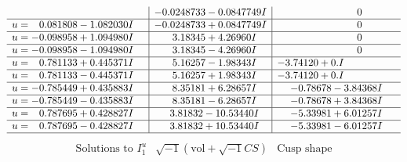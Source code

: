 \documentclass[1p]{elsarticle_modified}
\theoremstyle{definition}
\newcommand{\I}{\sqrt{-1}}
\begin{document}
$$\begin{array}{c|c|c}
 & -0.0248733 - 0.0847749 I & \phantom{-0.000000 } 0 \\ \hline\begin{aligned}
u &= \phantom{-}0.081808 - 1.082030 I\end{aligned}
 & -0.0248733 + 0.0847749 I & \phantom{-0.000000 } 0 \\ \hline\begin{aligned}
u &= -0.098958 + 1.094980 I\end{aligned}
 & \phantom{-}3.18345 + 4.26960 I & \phantom{-0.000000 } 0 \\ \hline\begin{aligned}
u &= -0.098958 - 1.094980 I\end{aligned}
 & \phantom{-}3.18345 - 4.26960 I & \phantom{-0.000000 } 0 \\ \hline\begin{aligned}
u &= \phantom{-}0.781133 + 0.445371 I\end{aligned}
 & \phantom{-}5.16257 - 1.98343 I & -3.74120 + 0. I\phantom{ +0.000000I} \\ \hline\begin{aligned}
u &= \phantom{-}0.781133 - 0.445371 I\end{aligned}
 & \phantom{-}5.16257 + 1.98343 I & -3.74120 + 0. I\phantom{ +0.000000I} \\ \hline\begin{aligned}
u &= -0.785449 + 0.435883 I\end{aligned}
 & \phantom{-}8.35181 + 6.28657 I & -0.78678 - 3.84368 I \\ \hline\begin{aligned}
u &= -0.785449 - 0.435883 I\end{aligned}
 & \phantom{-}8.35181 - 6.28657 I & -0.78678 + 3.84368 I \\ \hline\begin{aligned}
u &= \phantom{-}0.787695 + 0.428827 I\end{aligned}
 & \phantom{-}3.81832 - 10.53440 I & -5.33981 + 6.01257 I \\ \hline\begin{aligned}
u &= \phantom{-}0.787695 - 0.428827 I\end{aligned}
 & \phantom{-}3.81832 + 10.53440 I & -5.33981 - 6.01257 I\\
 \hline 
 \end{array}$$\newpage$$\begin{array}{c|c|c}  
\text{Solutions to }I^u_{1}& \I (\text{vol} + \sqrt{-1}CS) & \text{Cusp shape}\\

\end{array}$$
\end{document}

